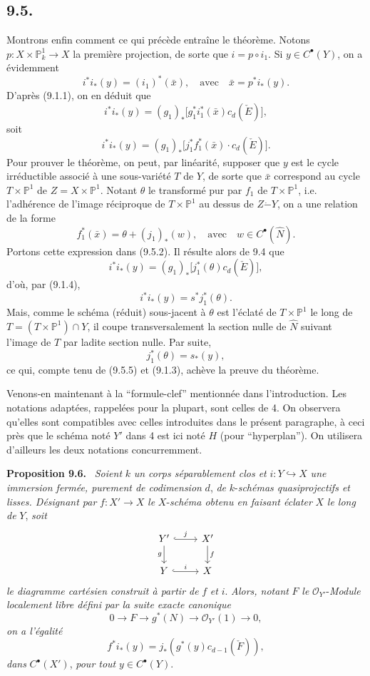 \documentclass[11pt]{article}
\newenvironment{statement}[1]{\par\medskip\noindent\textbf{#1.}\ }{\par\medskip}
\begin{document}
\subsection*{9.5.}

Montrons enfin comment ce qui précède entraîne le théorème. Notons $p:X\times\mathbb P^1_k\to X$ la première projection, de sorte que $i=p\circ i_1$. Si $y\in C^{\bullet}(Y)$, on a évidemment
\[
i^*i_*(y)=(i_1)^*(\bar x),\quad\text{avec}\quad \bar x=p^*i_*(y).
\tag{9.5.1}
\]
D'après (9.1.1), on en déduit que
\[
i^*i_*(y)=(g_1)_*\bigl[g_1^*i_1^*(\bar x)c_d(\check E)\bigr],
\]
soit
\[
i^*i_*(y)=(g_1)_*\bigl[j_1^*f_1^*(\bar x)\cdot c_d(\check E)\bigr].
\tag{9.5.2}
\]
Pour prouver le théorème, on peut, par linéarité, supposer que $y$ est le cycle irréductible associé à une sous-variété $T$ de $Y$, de sorte que $\bar x$ correspond au cycle $T\times\mathbb P^1$ de $Z=X\times\mathbb P^1$. Notant $\theta$ le transformé pur par $f_1$ de $T\times\mathbb P^1$, i.e. l'adhérence de l'image réciproque de $T\times\mathbb P^1$ au dessus de $Z\mathbin{\dot{-}}Y$, on a une relation de la forme
\[
f_1^*(\bar x)=\theta+(j_1)_*(w),\quad\text{avec}\quad w\in C^{\bullet}(\widehat N).
\tag{9.5.3}
\]
Portons cette expression dans (9.5.2). Il résulte alors de 9.4 que
\[
i^*i_*(y)=(g_1)_*\bigl[j_1^*(\theta)c_d(\check E)\bigr],
\tag{9.5.4}
\]
d'où, par (9.1.4),
\[
i^*i_*(y)=s^*j_1^*(\theta).
\tag{9.5.5}
\]
Mais, comme le schéma (réduit) sous-jacent à $\theta$ est l'éclaté de $T\times\mathbb P^1$ le long de $T=(T\times\mathbb P^1)\cap Y$, il coupe transversalement la section nulle de $\widehat N$ suivant l'image de $T$ par ladite section nulle. Par suite,
\[
j_1^*(\theta)=s_*(y),
\]
ce qui, compte tenu de (9.5.5) et (9.1.3), achève la preuve du théorème.

Venons-en maintenant à la ``formule-clef'' mentionnée dans l'introduction. Les notations adaptées, rappelées pour la plupart, sont celles de 4. On observera qu'elles sont compatibles avec celles introduites dans le présent paragraphe, à ceci près que le schéma noté $Y'$ dans 4 est ici noté $H$ (pour ``hyperplan''). On utilisera d'ailleurs les deux notations concurremment.

\begin{statement}{Proposition 9.6}
\emph{Soient} $k$ \emph{un corps séparablement clos et} $i:Y\hookrightarrow X$ \emph{une immersion fermée, purement de codimension} $d$, \emph{de} $k$-\emph{schémas quasiprojectifs et lisses. Désignant par} $f:X'\to X$ \emph{le} $X$-\emph{schéma obtenu en faisant éclater} $X$ \emph{le long de} $Y$, \emph{soit}
\[
\begin{tikzcd}
Y'\arrow[r,hook,"j"]\arrow[d,"g"']&X'\arrow[d,"f"]\\
Y\arrow[r,hook,"i"]&X
\end{tikzcd}
\]
\emph{le diagramme cartésien construit à partir de} $f$ \emph{et} $i$. \emph{Alors, notant} $F$ \emph{le} $\mathcal O_{Y'}$-\emph{Module localement libre défini par la suite exacte canonique}
\[
0\to F\to g^*(N)\to\mathcal O_{Y'}(1)\to0,
\tag{9.6.1}
\]
\emph{on a l'égalité}
\[
f^*i_*(y)=j_*(g^*(y)c_{d-1}(\check F)),
\tag{9.6.2}
\]
\emph{dans} $C^{\bullet}(X')$, \emph{pour tout} $y\in C^{\bullet}(Y)$.
\end{statement}
\end{document}
